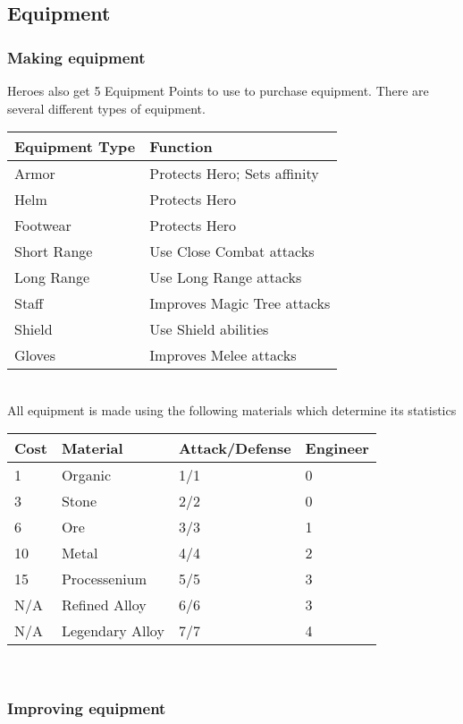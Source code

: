 \subsection{Equipment}
\subsubsection{Making equipment}
Heroes also get 5 Equipment Points to use to purchase equipment.  There are several different types of equipment. \\
\begin{tabularx}{\textwidth}{X X}
\hline
Equipment Type & Function \\
\hline 
Armor & Protects Hero;  Sets affinity\\
Helm & Protects Hero\\
Footwear & Protects Hero\\ 
Short Range & Use Close Combat attacks\\
Long Range & Use Long Range attacks \\
Staff & Improves Magic Tree attacks\\
Shield & Use Shield abilities\\
Gloves & Improves Melee attacks\\
\hline
\end{tabularx}\\

All equipment is made using the following materials which determine its statistics
\begin{center}
\begin{tabularx}{\textwidth}{X X X X}
\hline
Cost& Material& Attack/Defense & Engineer\\
\hline
1 & Organic & 1/1 & 0\\
3& Stone & 2/2 & 0\\
6& Ore& 3/3& 1\\
10& Metal& 4/4& 2\\
15& Processenium& 5/5& 3\\
N/A& Refined Alloy& 6/6& 3\\
N/A& Legendary Alloy& 7/7& 4\\
\hline
\end{tabularx}\\
\end{center}


\subsubsection{Improving equipment}

